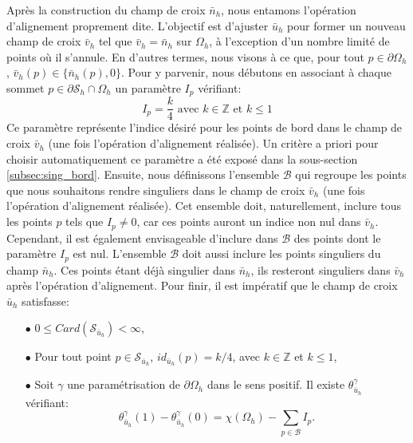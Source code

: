 Après la construction du champ de croix $\bar{n}_h$, nous entamons l'opération d'alignement proprement dite. L'objectif est d'ajuster $\bar{u}_h$ pour former un nouveau champ de croix $\bar{v}_h$ tel que $\bar{v}_h=\bar{n}_h$ sur $\Omega_h$, à l'exception d'un nombre limité de points où il s'annule. En d'autres termes, nous visons à ce que, pour tout $p\in\partial\Omega_h$, $\bar{v}_h(p)\in\{\bar{n}_h(p), 0\}$. Pour y parvenir, nous débutons en associant à chaque sommet $p\in\partial\mathcal{S}_h\cap\Omega_h$ un paramètre $I_p$ vérifiant:
\begin{equation}
I_p=\displaystyle\frac{k}{4}\mbox{ avec }k\in\mathbb{Z}\mbox{ et }k\leq 1
\end{equation}
Ce paramètre représente l'indice désiré pour les points de bord dans le champ de croix $\bar{v}_h$ (une fois l'opération d'alignement réalisée). Un critère a priori pour choisir automatiquement ce paramètre a été exposé dans la sous-section \ref{subsec:sing_bord}. Ensuite, nous définissons l'ensemble $\mathcal{B}$ qui regroupe les points que nous souhaitons rendre singuliers dans le champ de croix $\bar{v}_h$ (une fois l'opération d'alignement réalisée). Cet ensemble doit, naturellement, inclure tous les points $p$ tels que $I_p\neq 0$, car ces points auront un indice non nul dans $\bar{v}_h$. Cependant, il est également envisageable d'inclure dans $\mathcal{B}$ des points dont le paramètre $I_p$ est nul. L'ensemble $\mathcal{B}$ doit aussi inclure les points singuliers du champ $\bar{n}_h$. Ces points étant déjà singulier dans $\bar{n}_h$, ils resteront singuliers dans $\bar{v}_h$ après l'opération d'alignement. Pour finir, il est impératif que le champ de croix $\bar{u}_h$ satisfasse:\\
\begin{itemize}
 \item[$\bullet$] $0\leq Card(\mathcal{S}_{\bar{u}_h})<\infty$,\\
 \item[$\bullet$] Pour tout point $p\in\mathcal{S}_{\bar{u}_h}$, $id_{\bar{u}_h}(p)=k/4$, avec $k\in\mathbb{Z}$ et $k\leq 1$,\\
 \item[$\bullet$] Soit $\gamma$ une paramétrisation de $\partial\Omega_h$ dans le sens positif. Il existe $\theta_{\bar{u}_h}^\gamma$ vérifiant:
 \begin{equation}
    \label{eqn:etude_hyp_u_simple}
    \theta_{\bar{u}_h}^\gamma(1)-\theta_{\bar{u}_h}^\gamma(0)=\chi(\Omega_h)-\sum_{p\in\mathcal{B}}I_p.
\end{equation}
\end{itemize}
